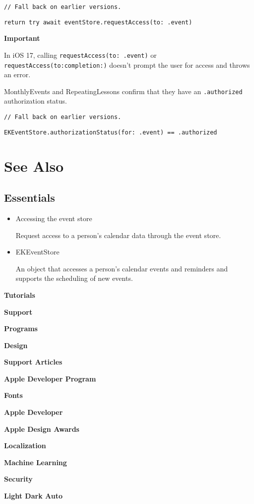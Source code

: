 \documentclass{article}
\begin{document}
\texttt{// Fall back on earlier versions.}

\texttt{return try await eventStore.requestAccess(to: .event)}

\textbf{Important}

In iOS 17, calling \texttt{requestAccess(to: .event)} or \texttt{requestAccess(to:completion:)} doesn't prompt the user for access and throws an error.

MonthlyEvents and RepeatingLessons confirm that they have an \texttt{.authorized} authorization status.

\texttt{// Fall back on earlier versions.}

\texttt{EKEventStore.authorizationStatus(for: .event) == .authorized}

\section*{See Also}

\subsection*{Essentials}

\begin{itemize}
    \item Accessing the event store

Request access to a person's calendar data through the event store.

    \item EKEventStore

An object that accesses a person’s calendar events and reminders and supports the scheduling of new events.
\end{itemize}

\bigskip

\hrulefill

\bigskip

\textbf{Tutorials}

\textbf{Support}

\textbf{Programs}

\textbf{Design}

\textbf{Support Articles}

\textbf{Apple Developer Program}

\textbf{Fonts}

\textbf{Apple Developer}

\textbf{Apple Design Awards}

\textbf{Localization}

\textbf{Machine Learning}

\textbf{Security}

\textbf{Light Dark Auto}

\newpage
\end{document}
